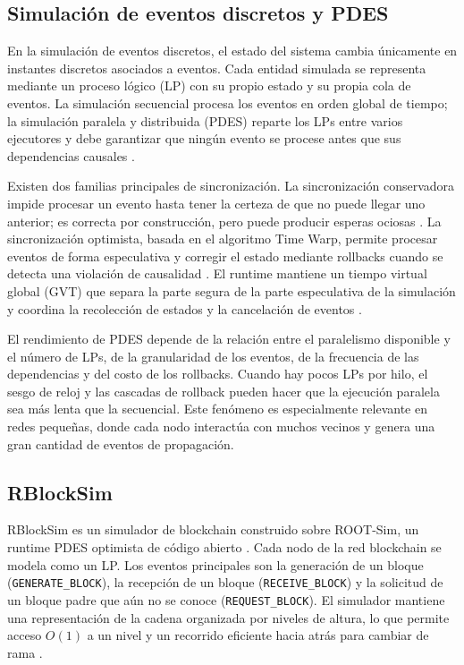 \documentclass[11pt,a4paper,oneside]{article}
\begin{document}
\subsection{Simulación de eventos discretos y PDES}

En la simulación de eventos discretos, el estado del sistema cambia únicamente en instantes discretos asociados a eventos. Cada entidad simulada se representa mediante un proceso lógico (LP) con su propio estado y su propia cola de eventos. La simulación secuencial procesa los eventos en orden global de tiempo; la simulación paralela y distribuida (PDES) reparte los LPs entre varios ejecutores y debe garantizar que ningún evento se procese antes que sus dependencias causales \cite{fujimoto1990pdes}.

Existen dos familias principales de sincronización. La sincronización conservadora impide procesar un evento hasta tener la certeza de que no puede llegar uno anterior; es correcta por construcción, pero puede producir esperas ociosas \cite{chandy1981asynchronous}. La sincronización optimista, basada en el algoritmo Time Warp, permite procesar eventos de forma especulativa y corregir el estado mediante rollbacks cuando se detecta una violación de causalidad \cite{jefferson1985virtual}. El runtime mantiene un tiempo virtual global (GVT) que separa la parte segura de la parte especulativa de la simulación y coordina la recolección de estados y la cancelación de eventos \cite{jefferson2022virtual}.

El rendimiento de PDES depende de la relación entre el paralelismo disponible y el número de LPs, de la granularidad de los eventos, de la frecuencia de las dependencias y del costo de los rollbacks. Cuando hay pocos LPs por hilo, el sesgo de reloj y las cascadas de rollback pueden hacer que la ejecución paralela sea más lenta que la secuencial. Este fenómeno es especialmente relevante en redes pequeñas, donde cada nodo interactúa con muchos vecinos y genera una gran cantidad de eventos de propagación.

\subsection{RBlockSim}

RBlockSim es un simulador de blockchain construido sobre ROOT-Sim, un runtime PDES optimista de código abierto \cite{pellegrini2012rootsim}. Cada nodo de la red blockchain se modela como un LP. Los eventos principales son la generación de un bloque (\texttt{GENERATE\_BLOCK}), la recepción de un bloque (\texttt{RECEIVE\_BLOCK}) y la solicitud de un bloque padre que aún no se conoce (\texttt{REQUEST\_BLOCK}). El simulador mantiene una representación de la cadena organizada por niveles de altura, lo que permite acceso $O(1)$ a un nivel y un recorrido eficiente hacia atrás para cambiar de rama \cite{pimpini2025rblocksim}.
\end{document}
